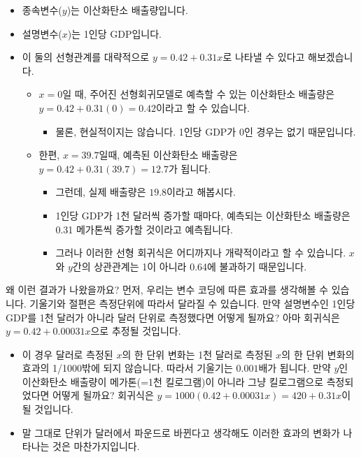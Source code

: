 \documentclass[]{book}
\providecommand{\tightlist}{%
  \setlength{\itemsep}{0pt}\setlength{\parskip}{0pt}}
\begin{document}
\begin{itemize}
\item
  종속변수(\(y\))는 이산화탄소 배출량입니다.
\item
  설명변수(\(x\))는 1인당 GDP입니다.
\item
  이 둘의 선형관계를 대략적으로 \(y = 0.42 + 0.31x\)로 나타낼 수 있다고 해보겠습니다.

  \begin{itemize}
  \tightlist
  \item
    \(x=0\)일 때, 주어진 선형회귀모델로 예측할 수 있는 이산화탄소 배출량은 \(y = 0.42 + 0.31(0) = 0.42\)이라고 할 수 있습니다.

    \begin{itemize}
    \tightlist
    \item
      물론, 현실적이지는 않습니다. 1인당 GDP가 0인 경우는 없기 때문입니다.
    \end{itemize}
  \item
    한편, \(x = 39.7\)일때, 예측된 이산화탄소 배출량은 \(y = 0.42 + 0.31(39.7) = 12.7\)가 됩니다.

    \begin{itemize}
    \tightlist
    \item
      그런데, 실제 배출량은 \(19.8\)이라고 해봅시다.
    \item
      1인당 GDP가 1천 달러씩 증가할 때마다, 예측되는 이산화탄소 배출량은 0.31 메가톤씩 증가할 것이라고 예측됩니다.
    \item
      그러나 이러한 선형 회귀식은 어디까지나 개략적이라고 할 수 있습니다. \(x\)와 \(y\)간의 상관관계는 1이 아니라 0.64에 불과하기 때문입니다.
    \end{itemize}
  \end{itemize}
\end{itemize}

왜 이런 결과가 나왔을까요? 먼저, 우리는 변수 코딩에 따른 효과를 생각해볼 수 있습니다. 기울기와 절편은 측정단위에 따라서 달라질 수 있습니다. 만약 설명변수인 1인당 GDP를 1천 달러가 아니라 달러 단위로 측정했다면 어떻게 될까요? 아마 회귀식은 \(y = 0.42 + 0.00031x\)으로 추정될 것입니다.

\begin{itemize}
\tightlist
\item
  이 경우 달러로 측정된 \(x\)의 한 단위 변화는 1천 달러로 측정된 \(x\)의 한 단위 변화의 효과의 1/1000밖에 되지 않습니다. 따라서 기울기는 \(0.001\)배가 됩니다. 만약 \(y\)인 이산화탄소 배출량이 메가톤(=1천 킬로그램)이 아니라 그냥 킬로그램으로 측정되었다면 어떻게 될까요? 회귀식은 \(y = 1000(0.42 + 0.00031x) = 420 + 0.31x\)이 될 것입니다.
\item
  말 그대로 단위가 달러에서 파운드로 바뀐다고 생각해도 이러한 효과의 변화가 나타나는 것은 마찬가지입니다.
\end{itemize}
\end{document}
